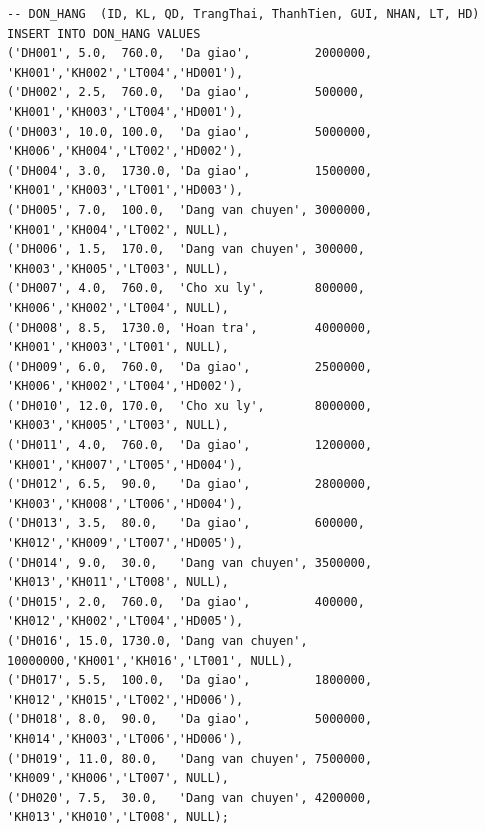 \documentclass[11pt]{report}
\begin{document}
\begin{verbatim}
-- DON_HANG  (ID, KL, QD, TrangThai, ThanhTien, GUI, NHAN, LT, HD)
INSERT INTO DON_HANG VALUES
('DH001', 5.0,  760.0,  'Da giao',         2000000, 'KH001','KH002','LT004','HD001'),
('DH002', 2.5,  760.0,  'Da giao',         500000,  'KH001','KH003','LT004','HD001'),
('DH003', 10.0, 100.0,  'Da giao',         5000000, 'KH006','KH004','LT002','HD002'),
('DH004', 3.0,  1730.0, 'Da giao',         1500000, 'KH001','KH003','LT001','HD003'),
('DH005', 7.0,  100.0,  'Dang van chuyen', 3000000, 'KH001','KH004','LT002', NULL),
('DH006', 1.5,  170.0,  'Dang van chuyen', 300000,  'KH003','KH005','LT003', NULL),
('DH007', 4.0,  760.0,  'Cho xu ly',       800000,  'KH006','KH002','LT004', NULL),
('DH008', 8.5,  1730.0, 'Hoan tra',        4000000, 'KH001','KH003','LT001', NULL),
('DH009', 6.0,  760.0,  'Da giao',         2500000, 'KH006','KH002','LT004','HD002'),
('DH010', 12.0, 170.0,  'Cho xu ly',       8000000, 'KH003','KH005','LT003', NULL),
('DH011', 4.0,  760.0,  'Da giao',         1200000, 'KH001','KH007','LT005','HD004'),
('DH012', 6.5,  90.0,   'Da giao',         2800000, 'KH003','KH008','LT006','HD004'),
('DH013', 3.5,  80.0,   'Da giao',         600000,  'KH012','KH009','LT007','HD005'),
('DH014', 9.0,  30.0,   'Dang van chuyen', 3500000, 'KH013','KH011','LT008', NULL),
('DH015', 2.0,  760.0,  'Da giao',         400000,  'KH012','KH002','LT004','HD005'),
('DH016', 15.0, 1730.0, 'Dang van chuyen', 10000000,'KH001','KH016','LT001', NULL),
('DH017', 5.5,  100.0,  'Da giao',         1800000, 'KH012','KH015','LT002','HD006'),
('DH018', 8.0,  90.0,   'Da giao',         5000000, 'KH014','KH003','LT006','HD006'),
('DH019', 11.0, 80.0,   'Dang van chuyen', 7500000, 'KH009','KH006','LT007', NULL),
('DH020', 7.5,  30.0,   'Dang van chuyen', 4200000, 'KH013','KH010','LT008', NULL);
\end{verbatim}
\end{document}
